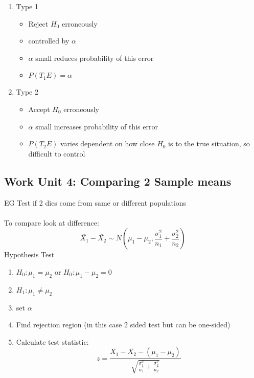 \documentclass[a4paper,10pt]{article}
\begin{document}
\begin{enumerate}
	\item Type 1
	\begin{itemize}
		\item Reject $H_0$ erroneously
		\item controlled by $\alpha$
		\item $\alpha$ small reduces probability of this error
		\item $P(T_1E) = \alpha$
	\end{itemize}
	\item Type 2
	\begin{itemize}
		\item Accept $H_0$ erroneously
		\item $\alpha$ small increases probability of this error
		\item $P(T_2E)$ varies dependent on how close $H_0$ is to the true situation, so difficult to control
	\end{itemize}
\end{enumerate}

\subsection{Work Unit 4: Comparing 2 Sample means}

EG Test if 2 dies come from same or different populations
\\ \\
To compare look at difference:
\[
	\bar{X_1}-\bar{X_2} \sim N(\mu_1-\mu_2, \frac{\sigma_1^2}{n_1}+\frac{\sigma_2^2}{n_2})
\]
Hypothesis Test
\begin{enumerate}
	\item $H_0: \mu_1 = \mu_2$ or $H_0: \mu_1 - \mu_2 = 0$
	\item $H_1: \mu_1 \neq \mu_2$
	\item set $\alpha$
	\item Find rejection region (in this case 2 sided test but can be one-sided)
	\item Calculate test statistic: \[ z = \frac{\bar{X_1}-\bar{X_2} - (\mu_1 - \mu_2)}{\sqrt{ \frac{\sigma_1^2}{n_1}+\frac{\sigma_2^2}{n_2}}} \]
\end{enumerate}


\end{document}
